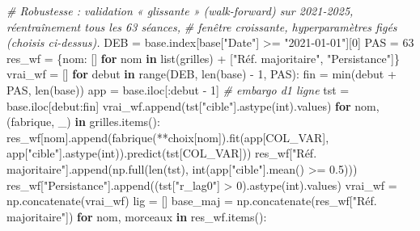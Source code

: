 \documentclass[
  10pt,
]{article}
\newenvironment{Shaded}{}{}
\newcommand{\BuiltInTok}[1]{\textcolor[rgb]{0.00,0.50,0.00}{#1}}
\newcommand{\CommentTok}[1]{\textcolor[rgb]{0.38,0.63,0.69}{\textit{#1}}}
\newcommand{\ControlFlowTok}[1]{\textcolor[rgb]{0.00,0.44,0.13}{\textbf{#1}}}
\newcommand{\DecValTok}[1]{\textcolor[rgb]{0.25,0.63,0.44}{#1}}
\newcommand{\FloatTok}[1]{\textcolor[rgb]{0.25,0.63,0.44}{#1}}
\newcommand{\KeywordTok}[1]{\textcolor[rgb]{0.00,0.44,0.13}{\textbf{#1}}}
\newcommand{\NormalTok}[1]{#1}
\newcommand{\OperatorTok}[1]{\textcolor[rgb]{0.40,0.40,0.40}{#1}}
\newcommand{\StringTok}[1]{\textcolor[rgb]{0.25,0.44,0.63}{#1}}
\begin{document}
\begin{Shaded}
\begin{Highlighting}[]
\CommentTok{\# Robustesse : validation « glissante » (walk{-}forward) sur 2021{-}2025, réentraînement tous les 63 séances,}
\CommentTok{\# fenêtre croissante, hyperparamètres figés (choisis ci{-}dessus).}
\NormalTok{DEB }\OperatorTok{=}\NormalTok{ base.index[base[}\StringTok{"Date"}\NormalTok{] }\OperatorTok{\textgreater{}=} \StringTok{"2021{-}01{-}01"}\NormalTok{][}\DecValTok{0}\NormalTok{]}
\NormalTok{PAS }\OperatorTok{=} \DecValTok{63}
\NormalTok{res\_wf }\OperatorTok{=}\NormalTok{ \{nom: [] }\ControlFlowTok{for}\NormalTok{ nom }\KeywordTok{in} \BuiltInTok{list}\NormalTok{(grilles) }\OperatorTok{+}\NormalTok{ [}\StringTok{"Réf. majoritaire"}\NormalTok{, }\StringTok{"Persistance"}\NormalTok{]\}}
\NormalTok{vrai\_wf }\OperatorTok{=}\NormalTok{ []}
\ControlFlowTok{for}\NormalTok{ debut }\KeywordTok{in} \BuiltInTok{range}\NormalTok{(DEB, }\BuiltInTok{len}\NormalTok{(base) }\OperatorTok{{-}} \DecValTok{1}\NormalTok{, PAS):}
\NormalTok{    fin }\OperatorTok{=} \BuiltInTok{min}\NormalTok{(debut }\OperatorTok{+}\NormalTok{ PAS, }\BuiltInTok{len}\NormalTok{(base))}
\NormalTok{    app }\OperatorTok{=}\NormalTok{ base.iloc[:debut }\OperatorTok{{-}} \DecValTok{1}\NormalTok{]                       }\CommentTok{\# embargo d\textquotesingle{}1 ligne}
\NormalTok{    tst }\OperatorTok{=}\NormalTok{ base.iloc[debut:fin]}
\NormalTok{    vrai\_wf.append(tst[}\StringTok{"cible"}\NormalTok{].astype(}\BuiltInTok{int}\NormalTok{).values)}
    \ControlFlowTok{for}\NormalTok{ nom, (fabrique, \_) }\KeywordTok{in}\NormalTok{ grilles.items():}
\NormalTok{        res\_wf[nom].append(fabrique(}\OperatorTok{**}\NormalTok{choix[nom]).fit(app[COL\_VAR], app[}\StringTok{"cible"}\NormalTok{].astype(}\BuiltInTok{int}\NormalTok{)).predict(tst[COL\_VAR]))}
\NormalTok{    res\_wf[}\StringTok{"Réf. majoritaire"}\NormalTok{].append(np.full(}\BuiltInTok{len}\NormalTok{(tst), }\BuiltInTok{int}\NormalTok{(app[}\StringTok{"cible"}\NormalTok{].mean() }\OperatorTok{\textgreater{}=} \FloatTok{0.5}\NormalTok{)))}
\NormalTok{    res\_wf[}\StringTok{"Persistance"}\NormalTok{].append((tst[}\StringTok{"r\_lag0"}\NormalTok{] }\OperatorTok{\textgreater{}} \DecValTok{0}\NormalTok{).astype(}\BuiltInTok{int}\NormalTok{).values)}
\NormalTok{vrai\_wf }\OperatorTok{=}\NormalTok{ np.concatenate(vrai\_wf)}
\NormalTok{lig }\OperatorTok{=}\NormalTok{ []}
\NormalTok{base\_maj }\OperatorTok{=}\NormalTok{ np.concatenate(res\_wf[}\StringTok{"Réf. majoritaire"}\NormalTok{])}
\ControlFlowTok{for}\NormalTok{ nom, morceaux }\KeywordTok{in}\NormalTok{ res\_wf.items():}

\end{Highlighting}
\end{Shaded}
\end{document}
